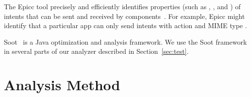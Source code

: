 \begin{sloppypar}
The Epicc tool precisely and efficiently identifies
properties (such as , , and ) of
intents that can be sent and received by components~\cite{octeau2013effective}.  For example, Epicc might
identify that a particular app can only send intents with action
 and MIME type .
\end{sloppypar}

Soot~\cite{vallee1999soot} is a Java optimization and analysis framework.
We use the Soot framework in several parts of our analyzer described in Section~\ref{sec:test}.








\chapter{Analysis Method}
\label{sec:analysis}

